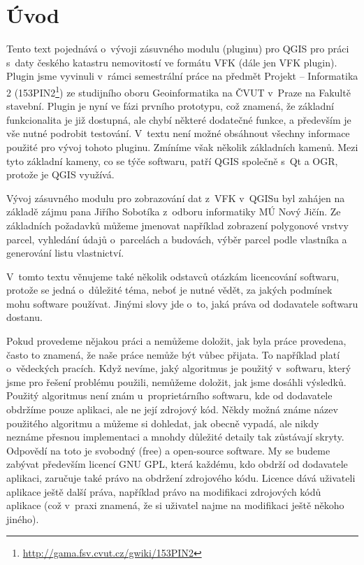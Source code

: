 \documentclass[a4paper,12pt]{article}
\begin{document}
\section{Úvod}
Tento text pojednává o~vývoji zásuvného modulu (pluginu) pro QGIS pro práci s~daty českého katastru nemovitostí ve formátu VFK (dále jen VFK plugin).
Plugin jsme vyvinuli v~rámci semestrální práce na předmět Projekt -- Informatika 2 (153PIN2\footnote{\url{http://gama.fsv.cvut.cz/gwiki/153PIN2}}) ze studijního oboru Geoinformatika na ČVUT v~Praze na Fakultě stavební.
Plugin je nyní ve fázi prvního prototypu, což znamená, že základní funkcionalita je již dostupná, ale chybí některé dodatečné funkce, a především je vše nutné podrobit testování.
V~textu není možné obsáhnout všechny informace použité pro vývoj tohoto pluginu.
Zmíníme však několik základních kamenů.
Mezi tyto základní kameny, co se týče softwaru, patří QGIS společně s~Qt a OGR, protože je QGIS využívá.

Vývoj zásuvného modulu pro zobrazování dat z~VFK v~QGISu byl zahájen na základě zájmu pana Jiřího Sobotíka z~odboru informatiky MÚ Nový Jičín.
Ze základních požadavků můžeme jmenovat například zobrazení polygonové vrstvy parcel, vyhledání údajů o~parcelách a budovách, výběr parcel podle vlastníka a generování listu vlastnictví.


V~tomto textu věnujeme také několik odstavců otázkám licencování softwaru, protože se jedná o~důležité téma, neboť je nutné vědět, za jakých podmínek mohu software používat.
Jinými slovy jde o~to, jaká práva od dodavatele softwaru dostanu.

Pokud provedeme nějakou práci a nemůžeme doložit, jak byla práce provedena, často to znamená, že naše práce nemůže být vůbec přijata.
To například platí o~vědeckých pracích.
Když nevíme, jaký algoritmus je použitý v~softwaru, který jsme pro řešení problému použili, nemůžeme doložit, jak jsme dosáhli výsledků.
Použitý algoritmus není znám u~proprietárního softwaru, kde od dodavatele obdržíme pouze aplikaci, ale ne její zdrojový kód.
Někdy možná známe název použitého algoritmu a můžeme si dohledat, jak obecně vypadá, ale nikdy neznáme přesnou implementaci a mnohdy důležité detaily tak zůstávají skryty.
Odpovědí na toto je svobodný (free) a open-source software.
My se budeme zabývat především licencí GNU GPL, která každému, kdo obdrží od dodavatele aplikaci, zaručuje také právo na obdržení zdrojového kódu.
Licence dává uživateli aplikace ještě další práva, například právo na modifikaci zdrojových kódů aplikace (což v~praxi znamená, že si uživatel najme na modifikaci ještě někoho jiného).
\end{document}
